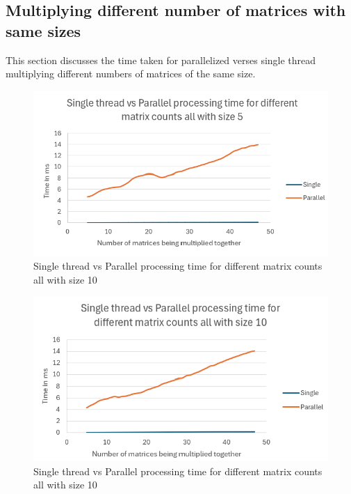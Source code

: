 
\subsection{ Multiplying different number of matrices with same sizes}
This section discusses the time taken for parallelized verses single thread multiplying different numbers of matrices of the same size.

\begin{figure}[H]
    \centering
    \includegraphics[width=1\columnwidth]{Figures/different_matrix_counts_size 5.png}
    \caption{Single thread vs Parallel processing time for different matrix counts all with size 10}
    \label{fig:different_matrix_counts_size 5}
\end{figure}

\begin{figure}[H]
    \centering
    \includegraphics[width=1\columnwidth]{Figures/different_matrix_counts_size 10.png}
    \caption{Single thread vs Parallel processing time for different matrix counts all with size 10}
    \label{fig:different_matrix_counts_size 10}
\end{figure}

